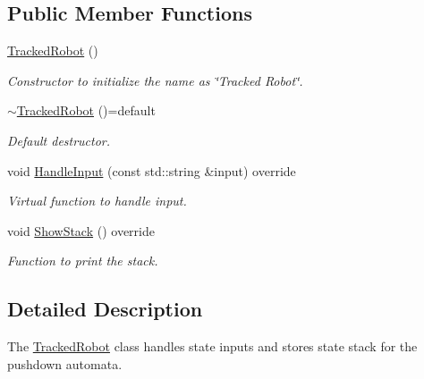 \subsection*{Public Member Functions}
\begin{DoxyCompactItemize}
\item 
\mbox{\label{class_tracked_robot_a1ab6c59177c5b8597e4be2c948970546}} 
\mbox{\hyperlink{class_tracked_robot_a1ab6c59177c5b8597e4be2c948970546}{Tracked\+Robot}} ()
\begin{DoxyCompactList}\small\item\em Constructor to initialize the name as \char`\"{}\+Tracked Robot\char`\"{}. \end{DoxyCompactList}\item 
\mbox{\label{class_tracked_robot_a99a8cc124539610c76a4362617fd7cee}} 
\mbox{\hyperlink{class_tracked_robot_a99a8cc124539610c76a4362617fd7cee}{$\sim$\+Tracked\+Robot}} ()=default
\begin{DoxyCompactList}\small\item\em Default destructor. \end{DoxyCompactList}\item 
void \mbox{\hyperlink{class_tracked_robot_a3522a61808d4bb1eb1779c9b8589b8f0}{Handle\+Input}} (const std\+::string \&input) override
\begin{DoxyCompactList}\small\item\em Virtual function to handle input. \end{DoxyCompactList}\item 
\mbox{\label{class_tracked_robot_a71b851eb983c8c2b607fad7a12ae02b8}} 
void \mbox{\hyperlink{class_tracked_robot_a71b851eb983c8c2b607fad7a12ae02b8}{Show\+Stack}} () override
\begin{DoxyCompactList}\small\item\em Function to print the stack. \end{DoxyCompactList}\end{DoxyCompactItemize}


\subsection{Detailed Description}
The \mbox{\hyperlink{class_tracked_robot}{Tracked\+Robot}} class handles state inputs and stores state stack for the pushdown automata. 

